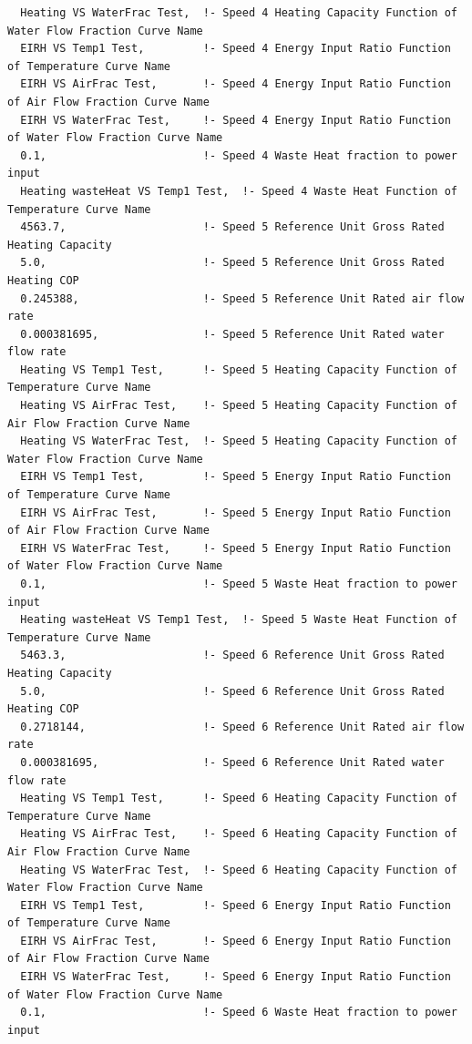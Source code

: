 \begin{lstlisting}
  Heating VS WaterFrac Test,  !- Speed 4 Heating Capacity Function of Water Flow Fraction Curve Name
  EIRH VS Temp1 Test,         !- Speed 4 Energy Input Ratio Function of Temperature Curve Name
  EIRH VS AirFrac Test,       !- Speed 4 Energy Input Ratio Function of Air Flow Fraction Curve Name
  EIRH VS WaterFrac Test,     !- Speed 4 Energy Input Ratio Function of Water Flow Fraction Curve Name
  0.1,                        !- Speed 4 Waste Heat fraction to power input
  Heating wasteHeat VS Temp1 Test,  !- Speed 4 Waste Heat Function of Temperature Curve Name
  4563.7,                     !- Speed 5 Reference Unit Gross Rated Heating Capacity
  5.0,                        !- Speed 5 Reference Unit Gross Rated Heating COP
  0.245388,                   !- Speed 5 Reference Unit Rated air flow rate
  0.000381695,                !- Speed 5 Reference Unit Rated water flow rate
  Heating VS Temp1 Test,      !- Speed 5 Heating Capacity Function of Temperature Curve Name
  Heating VS AirFrac Test,    !- Speed 5 Heating Capacity Function of Air Flow Fraction Curve Name
  Heating VS WaterFrac Test,  !- Speed 5 Heating Capacity Function of Water Flow Fraction Curve Name
  EIRH VS Temp1 Test,         !- Speed 5 Energy Input Ratio Function of Temperature Curve Name
  EIRH VS AirFrac Test,       !- Speed 5 Energy Input Ratio Function of Air Flow Fraction Curve Name
  EIRH VS WaterFrac Test,     !- Speed 5 Energy Input Ratio Function of Water Flow Fraction Curve Name
  0.1,                        !- Speed 5 Waste Heat fraction to power input
  Heating wasteHeat VS Temp1 Test,  !- Speed 5 Waste Heat Function of Temperature Curve Name
  5463.3,                     !- Speed 6 Reference Unit Gross Rated Heating Capacity
  5.0,                        !- Speed 6 Reference Unit Gross Rated Heating COP
  0.2718144,                  !- Speed 6 Reference Unit Rated air flow rate
  0.000381695,                !- Speed 6 Reference Unit Rated water flow rate
  Heating VS Temp1 Test,      !- Speed 6 Heating Capacity Function of Temperature Curve Name
  Heating VS AirFrac Test,    !- Speed 6 Heating Capacity Function of Air Flow Fraction Curve Name
  Heating VS WaterFrac Test,  !- Speed 6 Heating Capacity Function of Water Flow Fraction Curve Name
  EIRH VS Temp1 Test,         !- Speed 6 Energy Input Ratio Function of Temperature Curve Name
  EIRH VS AirFrac Test,       !- Speed 6 Energy Input Ratio Function of Air Flow Fraction Curve Name
  EIRH VS WaterFrac Test,     !- Speed 6 Energy Input Ratio Function of Water Flow Fraction Curve Name
  0.1,                        !- Speed 6 Waste Heat fraction to power input

\end{lstlisting}

